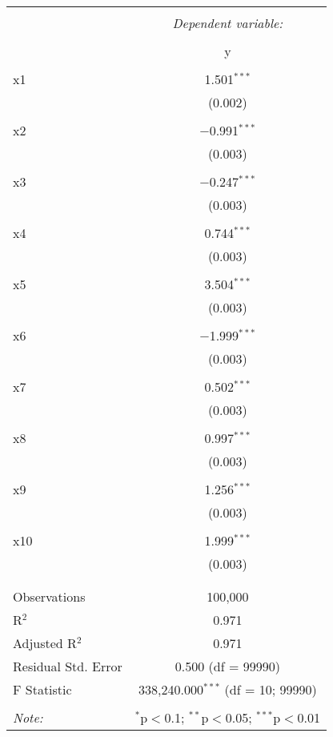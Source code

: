 \documentclass{article}
\begin{document}
\begin{table}[!htbp] \centering 
  \caption{} 
  \label{} 
\begin{tabular}{@{\extracolsep{5pt}}lc} 
\\[-1.8ex]\hline 
\hline \\[-1.8ex] 
 & \multicolumn{1}{c}{\textit{Dependent variable:}} \\ 
\cline{2-2} 
\\[-1.8ex] & y \\ 
\hline \\[-1.8ex] 
 x1 & 1.501$^{***}$ \\ 
  & (0.002) \\ 
  & \\ 
 x2 & $-$0.991$^{***}$ \\ 
  & (0.003) \\ 
  & \\ 
 x3 & $-$0.247$^{***}$ \\ 
  & (0.003) \\ 
  & \\ 
 x4 & 0.744$^{***}$ \\ 
  & (0.003) \\ 
  & \\ 
 x5 & 3.504$^{***}$ \\ 
  & (0.003) \\ 
  & \\ 
 x6 & $-$1.999$^{***}$ \\ 
  & (0.003) \\ 
  & \\ 
 x7 & 0.502$^{***}$ \\ 
  & (0.003) \\ 
  & \\ 
 x8 & 0.997$^{***}$ \\ 
  & (0.003) \\ 
  & \\ 
 x9 & 1.256$^{***}$ \\ 
  & (0.003) \\ 
  & \\ 
 x10 & 1.999$^{***}$ \\ 
  & (0.003) \\ 
  & \\ 
\hline \\[-1.8ex] 
Observations & 100,000 \\ 
R$^{2}$ & 0.971 \\ 
Adjusted R$^{2}$ & 0.971 \\ 
Residual Std. Error & 0.500 (df = 99990) \\ 
F Statistic & 338,240.000$^{***}$ (df = 10; 99990) \\ 
\hline 
\hline \\[-1.8ex] 
\textit{Note:}  & \multicolumn{1}{r}{$^{*}$p$<$0.1; $^{**}$p$<$0.05; $^{***}$p$<$0.01} \\ 
\end{tabular} 
\end{table} 
\end{document}
